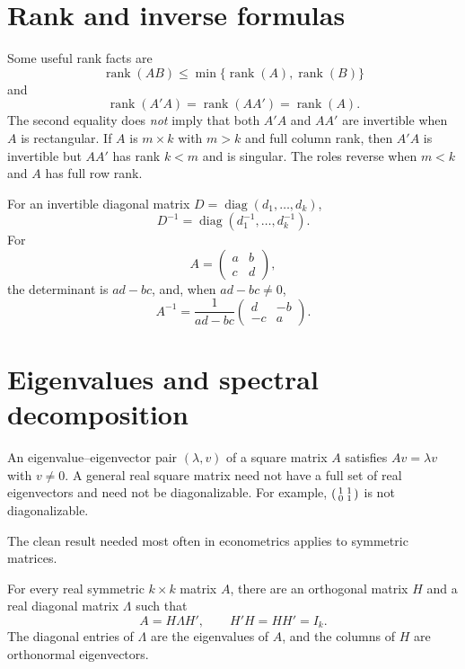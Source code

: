\section{Rank and inverse formulas}

Some useful rank facts are
\[
  \operatorname{rank}(AB)
  \leq \min\{\operatorname{rank}(A),\operatorname{rank}(B)\}
\]
and
\[
  \operatorname{rank}(A'A)=\operatorname{rank}(AA')
  =\operatorname{rank}(A).
\]
The second equality does \emph{not} imply that both $A'A$ and $AA'$ are
invertible when $A$ is rectangular.  If $A$ is $m\times k$ with $m>k$ and
full column rank, then $A'A$ is invertible but $AA'$ has rank $k<m$ and is
singular.  The roles reverse when $m<k$ and $A$ has full row rank.

For an invertible diagonal matrix
$D=\operatorname{diag}(d_1,\ldots,d_k)$,
\[
  D^{-1}=\operatorname{diag}(d_1^{-1},\ldots,d_k^{-1}).
\]
For
\[
  A=\begin{pmatrix}a&b\\c&d\end{pmatrix},
\]
the determinant is $ad-bc$, and, when $ad-bc\neq0$,
\[
  A^{-1}=\frac{1}{ad-bc}
  \begin{pmatrix}d&-b\\-c&a\end{pmatrix}.
\]

\section{Eigenvalues and spectral decomposition}

An eigenvalue--eigenvector pair $(\lambda,v)$ of a square matrix $A$ satisfies
$Av=\lambda v$ with $v\neq0$.  A general real square matrix need not have a
full set of real eigenvectors and need not be diagonalizable.  For example,
$\begin{psmallmatrix}1&1\\0&1\end{psmallmatrix}$ is not diagonalizable.

The clean result needed most often in econometrics applies to symmetric
matrices.

\begin{theorem}
For every real symmetric $k\times k$ matrix $A$, there are an orthogonal
matrix $H$ and a real diagonal matrix $\Lambda$ such that
\[
  A=H\Lambda H',\qquad H'H=HH'=I_k.
\]
The diagonal entries of $\Lambda$ are the eigenvalues of $A$, and the columns
of $H$ are orthonormal eigenvectors.
\end{theorem}

